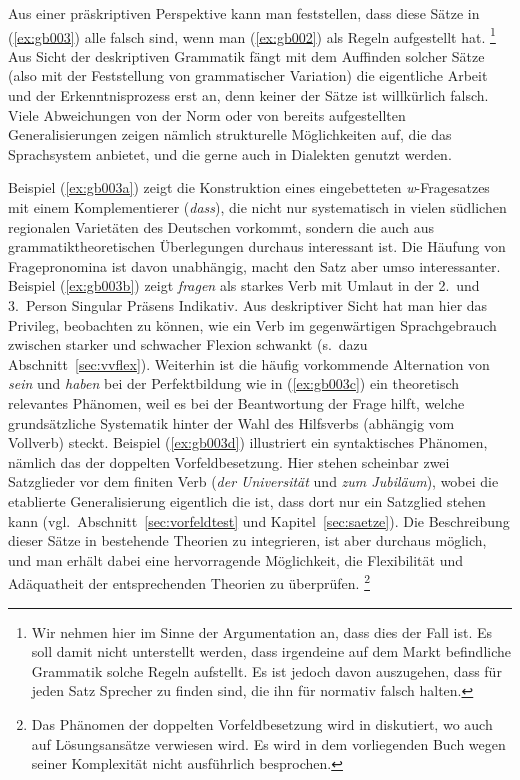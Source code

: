 Aus einer präskriptiven Perspektive kann man feststellen, dass diese Sätze in (\ref{ex:gb003}) alle falsch sind, wenn man (\ref{ex:gb002}) als Regeln aufgestellt hat.%
\footnote{Wir nehmen hier im Sinne der Argumentation an, dass dies der Fall ist.
Es soll damit nicht unterstellt werden, dass irgendeine auf dem Markt befindliche Grammatik solche Regeln aufstellt.
Es ist jedoch davon auszugehen, dass für jeden Satz Sprecher zu finden sind, die ihn für normativ falsch halten.}
Aus Sicht der deskriptiven Grammatik fängt mit dem Auffinden solcher Sätze (also mit der Feststellung von grammatischer Variation) die eigentliche Arbeit und der Erkenntnisprozess erst an, denn keiner der Sätze ist willkürlich falsch.
Viele Abweichungen von der Norm oder von bereits aufgestellten Generalisierungen zeigen nämlich strukturelle Möglichkeiten auf, die das Sprachsystem anbietet, und die gerne auch in Dialekten genutzt werden.

Beispiel (\ref{ex:gb003a}) zeigt die Konstruktion eines eingebetteten \textit{w}-Fragesatzes mit einem Komplementierer (\textit{dass}), die nicht nur systematisch in vielen südlichen regionalen Varietäten des Deutschen vorkommt, sondern die auch aus grammatiktheoretischen Überlegungen durchaus interessant ist.
Die Häufung von Fragepronomina ist davon unabhängig, macht den Satz aber umso interessanter.
Beispiel (\ref{ex:gb003b}) zeigt \textit{fragen} als starkes Verb mit Umlaut in der 2.\ und 3.\ Person Singular Präsens Indikativ.
Aus deskriptiver Sicht hat man hier das Privileg, beobachten zu können, wie ein Verb im gegenwärtigen Sprachgebrauch zwischen starker und schwacher Flexion schwankt (s.\ dazu Abschnitt~\ref{sec:vvflex}).
Weiterhin ist die häufig vorkommende Alternation von \textit{sein} und \textit{haben} bei der Perfektbildung wie in (\ref{ex:gb003c}) ein theoretisch relevantes Phänomen, weil es bei der Beantwortung der Frage hilft, welche grundsätzliche Systematik hinter der Wahl des Hilfsverbs (abhängig vom Vollverb) steckt.
Beispiel (\ref{ex:gb003d}) illustriert ein syntaktisches Phänomen, nämlich das der doppelten Vorfeldbesetzung.
Hier stehen scheinbar zwei Satzglieder vor dem finiten Verb (\textit{der Universität} und \textit{zum Jubiläum}), wobei die etablierte Generalisierung eigentlich die ist, dass dort nur ein Satzglied stehen kann (vgl.\ Abschnitt~\ref{sec:vorfeldtest} und Kapitel~\ref{sec:saetze}).
Die Beschreibung dieser Sätze in bestehende Theorien zu integrieren, ist aber durchaus möglich, und man erhält dabei eine hervorragende Möglichkeit, die Flexibilität und Adäquatheit der entsprechenden Theorien zu überprüfen.%
\footnote{Das Phänomen der doppelten Vorfeldbesetzung wird in \citet{Mueller03} diskutiert, wo auch auf Lösungsansätze verwiesen wird.
Es wird in dem vorliegenden Buch wegen seiner Komplexität nicht ausführlich besprochen.}

